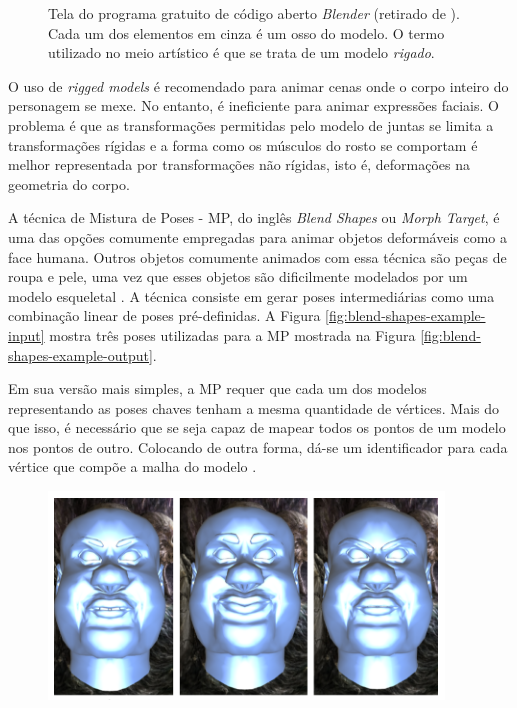 {\begin{figure}[!htb]
  \caption{ Tela do programa gratuito de código aberto \textit{Blender} (retirado de \cite{rigs-tutorial}). Cada um dos elementos em cinza é um osso do modelo. O termo utilizado no meio artístico é que se trata de um modelo \textit{rigado}.}

\label{fig:rigged-models} 
\end{figure}
    
  O uso de \textit{rigged models} é recomendado para animar cenas onde o corpo
inteiro do personagem se mexe. No entanto, é ineficiente para animar
expressões faciais. O problema é que as transformações permitidas pelo modelo
de juntas se limita a transformações rígidas e a forma como os músculos do
rosto se comportam é melhor representada por transformações não rígidas, isto
é, deformações na geometria do corpo.
    
    A técnica de  Mistura de Poses -
MP, do inglês \textit{Blend Shapes} ou \textit{Morph Target}, é uma das
opções comumente empregadas para animar objetos deformáveis como a face
humana. Outros objetos comumente animados com essa técnica são peças de
roupa e pele, uma vez que esses objetos são dificilmente modelados por um
modelo esqueletal \cite{master-thesis-on-blend-shapes}. A técnica consiste
em gerar poses intermediárias como uma combinação linear de poses
pré-definidas. A Figura \ref{fig:blend-shapes-example-input} mostra três
poses utilizadas para a MP mostrada na Figura
\ref{fig:blend-shapes-example-output}.
    
    Em sua versão mais simples, a MP requer que cada um dos modelos
representando as poses chaves tenham a mesma quantidade de vértices. Mais do
que isso, é necessário que se seja capaz de mapear todos os pontos de um
modelo nos pontos de outro. Colocando de outra forma, dá-se um identificador
para cada vértice que compõe a malha do modelo
\cite{tutorial-supremo-on-blend-shapes}.    
    
\FloatBarrier
\begin{figure}[!htb]
   \centering
  \includegraphics[width=0.7\linewidth]{./figs/inputToBlendShapes.png}


\end{figure}}
